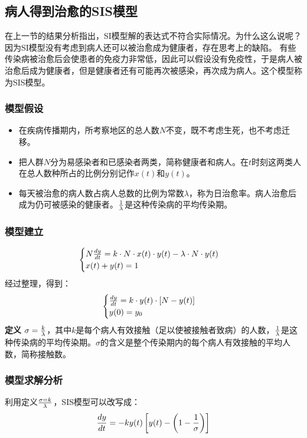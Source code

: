 \documentclass[openany]{progbookcn}
\begin{document}
\subsection{病人得到治愈的SIS模型}
在上一节的结果分析指出，SI模型解的表达式不符合实际情况。为什么这么说呢？因为SI模型没有考虑到病人还可以被治愈成为健康者，存在思考上的缺陷。
\indent 有些传染病被治愈后会使患者的免疫力非常低，因此可以假设没有免疫性，于是病人被治愈后成为健康者，但是健康者还有可能再次被感染，再次成为病人。这个模型称为SIS模型。
\subsubsection{模型假设}
\begin{itemize}
\item 在疾病传播期内，所考察地区的总人数$N$不变，既不考虑生死，也不考虑迁移。
\item 把人群$N$分为易感染者和已感染者两类，简称健康者和病人。在$t$时刻这两类人在总人数种所占的比例分别记作$x(t)$和$y(t)$。
\item 每天被治愈的病人数占病人总数的比例为常数$\lambda$，称为日治愈率。病人治愈后成为仍可被感染的健康者。$1\over\lambda$是这种传染病的平均传染期。
\end{itemize}
\subsubsection{模型建立}
\begin{equation}
\begin{cases}
N{{dy}\over{dt}}=k\cdot N\cdot x(t)\cdot y(t)-\lambda\cdot N\cdot y(t)\\
x(t)+y(t)=1
\end{cases}
\end{equation}
\indent 经过整理，得到：
\begin{equation}
\begin{cases}
{{dy}\over{dt}}=k\cdot y(t)\cdot [N-y(t)]\\
y(0)=y_0
\end{cases}
\end{equation}
\noindent \textbf{定义} $\sigma={k\over\lambda}$，其中$k$是每个病人有效接触（足以使被接触者致病）的人数，$1\over\lambda$是这种传染病的平均传染期。$\sigma$的含义是整个传染期内的每个病人有效接触的平均人数，简称接触数。
\subsubsection{模型求解分析}
\indent 利用定义$\sigma=k\over \lambda$，SIS模型可以改写成：
\begin{equation}
{{dy}\over{dt}}=-ky(t)\left[y(t)-\left(1-{1\over\sigma} \right) \right]
\end{equation}
\end{document}
